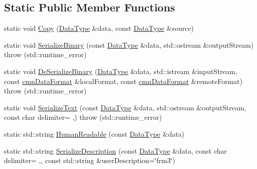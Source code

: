 \subsection*{Static Public Member Functions}
\begin{DoxyCompactItemize}
\item 
static void \hyperlink{classcmn_data_3_01vct_frame_base_3_01__rotation_type_01_4_01_4_a8fa2049183157a61bbdf3e1b32ed93bf}{Copy} (\hyperlink{classcmn_data_3_01vct_frame_base_3_01__rotation_type_01_4_01_4_a6d3becc05b41db88283c842177d23bea}{Data\+Type} \&data, const \hyperlink{classcmn_data_3_01vct_frame_base_3_01__rotation_type_01_4_01_4_a6d3becc05b41db88283c842177d23bea}{Data\+Type} \&source)
\item 
static void \hyperlink{classcmn_data_3_01vct_frame_base_3_01__rotation_type_01_4_01_4_aa6e15a5f25215267a910677d5471b0cd}{Serialize\+Binary} (const \hyperlink{classcmn_data_3_01vct_frame_base_3_01__rotation_type_01_4_01_4_a6d3becc05b41db88283c842177d23bea}{Data\+Type} \&data, std\+::ostream \&output\+Stream)  throw (std\+::runtime\+\_\+error)
\item 
static void \hyperlink{classcmn_data_3_01vct_frame_base_3_01__rotation_type_01_4_01_4_a52dbfd7c5424edfd70df03f735adee44}{De\+Serialize\+Binary} (\hyperlink{classcmn_data_3_01vct_frame_base_3_01__rotation_type_01_4_01_4_a6d3becc05b41db88283c842177d23bea}{Data\+Type} \&data, std\+::istream \&input\+Stream, const \hyperlink{classcmn_data_format}{cmn\+Data\+Format} \&local\+Format, const \hyperlink{classcmn_data_format}{cmn\+Data\+Format} \&remote\+Format)  throw (std\+::runtime\+\_\+error)
\item 
static void \hyperlink{classcmn_data_3_01vct_frame_base_3_01__rotation_type_01_4_01_4_ac3640a018200a1c0255e6caddeca4de4}{Serialize\+Text} (const \hyperlink{classcmn_data_3_01vct_frame_base_3_01__rotation_type_01_4_01_4_a6d3becc05b41db88283c842177d23bea}{Data\+Type} \&data, std\+::ostream \&output\+Stream, const char delimiter= \textquotesingle{},\textquotesingle{})  throw (std\+::runtime\+\_\+error)
\item 
static std\+::string \hyperlink{classcmn_data_3_01vct_frame_base_3_01__rotation_type_01_4_01_4_a9398bd4ed6cd6fa26fe394e71f09f722}{Human\+Readable} (const \hyperlink{classcmn_data_3_01vct_frame_base_3_01__rotation_type_01_4_01_4_a6d3becc05b41db88283c842177d23bea}{Data\+Type} \&data)
\item 
static std\+::string \hyperlink{classcmn_data_3_01vct_frame_base_3_01__rotation_type_01_4_01_4_a769798327b1edafad7c067a1b7cff038}{Serialize\+Description} (const \hyperlink{classcmn_data_3_01vct_frame_base_3_01__rotation_type_01_4_01_4_a6d3becc05b41db88283c842177d23bea}{Data\+Type} \&data, const char delimiter= \textquotesingle{},\textquotesingle{}, const std\+::string \&user\+Description=\char`\"{}frm3\char`\"{})

\end{DoxyCompactItemize}
